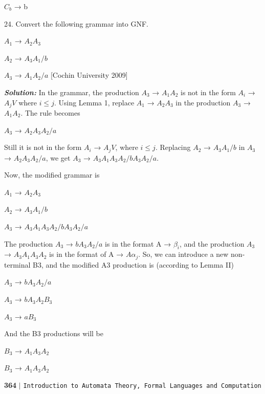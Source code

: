 \documentclass{article}
\begin{document}
\hspace*{5cm} $C_b$ → b 

24. Convert the following grammar into GNF.  

\hspace*{5cm} $A_1$ → $A_2A_3$ 

\hspace*{5cm} $A_2$ → $A_3A_1/b$ 

\hspace*{5cm} $A_3$ → $A_1A_2/a$ \hfill [Cochin University 2009]

\textit{\textbf{Solution:}} In the grammar, the production $A_3$ → $A_1A_2$ is not in the form $A_i$ → $A_jV$ where $i \leq j$. Using Lemma 1, replace $A_1$ → $A_2A_3$ in the production $A_3$ → $A_1A_2$. The rule becomes 

\hspace*{5cm} $A_3$ → $A_2A_3A_2/a$ 

Still it is not in the form $A_i$ → $A_jV$, where $i \leq j$. Replacing $A_2$ → $A_3A_1/b$ in $A_3$ → $A_2A_3A_2/a$, we get $A_3$ → $A_3A_1A_3A_2/bA_3A_2/a$. 

Now, the modiﬁed grammar is 

\hspace*{5cm} $A_1$ → $A_2A_3$

\hspace*{5cm} $A_2$ → $A_3A_1/b$ 

\hspace*{5cm} $A_3$ → $A_3A_1A_3A_2/bA_3A_2/a$ 

The production $A_3$ → $bA_3A_2/a$ is in the format A → $\beta_i$, and the production $A_3$ → $A_3A_1A_3A_2$ is in the format of A → $A\alpha_j$. So, we can introduce a new non-terminal B3, and the modiﬁed A3 production is (according to Lemma II) 

\hspace*{5cm} $A_3$ → $bA_3A_2/a$ 

\hspace*{5cm} $A_3$ → $bA_3A_2B_3$ 

\hspace*{5cm} $A_3$ → $aB_3$ 

And the B3 productions will be 

\hspace*{5cm} $B_3$ → $A_1A_3A_2$ 

\hspace*{5cm} $B_3$ → $A_1A_3A_2$


\newpage
\begin{flushleft}
	\textbf{364}\hspace*{0.1cm} \textbf{$|$} \hspace*{0.1cm} \texttt{Introduction to Automata Theory, Formal Languages and Computation}
\end{flushleft}
\vspace*{0.5cm}
\end{document}
